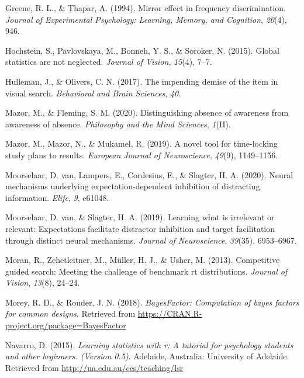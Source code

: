 \documentclass[
  english,
  man]{apa6}
\begin{document}
\leavevmode\hypertarget{ref-greene1994mirror}{}%
Greene, R. L., \& Thapar, A. (1994). Mirror effect in frequency discrimination. \emph{Journal of Experimental Psychology: Learning, Memory, and Cognition}, \emph{20}(4), 946.

\leavevmode\hypertarget{ref-hochstein2015global}{}%
Hochstein, S., Pavlovskaya, M., Bonneh, Y. S., \& Soroker, N. (2015). Global statistics are not neglected. \emph{Journal of Vision}, \emph{15}(4), 7--7.

\leavevmode\hypertarget{ref-hulleman2017impending}{}%
Hulleman, J., \& Olivers, C. N. (2017). The impending demise of the item in visual search. \emph{Behavioral and Brain Sciences}, \emph{40}.

\leavevmode\hypertarget{ref-mazor2020distinguishing}{}%
Mazor, M., \& Fleming, S. M. (2020). Distinguishing absence of awareness from awareness of absence. \emph{Philosophy and the Mind Sciences}, \emph{1}(II).

\leavevmode\hypertarget{ref-mazor2019novel}{}%
Mazor, M., Mazor, N., \& Mukamel, R. (2019). A novel tool for time-locking study plans to results. \emph{European Journal of Neuroscience}, \emph{49}(9), 1149--1156.

\leavevmode\hypertarget{ref-van2020neural}{}%
Moorselaar, D. van, Lampers, E., Cordesius, E., \& Slagter, H. A. (2020). Neural mechanisms underlying expectation-dependent inhibition of distracting information. \emph{Elife}, \emph{9}, e61048.

\leavevmode\hypertarget{ref-van2019learning}{}%
Moorselaar, D. van, \& Slagter, H. A. (2019). Learning what is irrelevant or relevant: Expectations facilitate distractor inhibition and target facilitation through distinct neural mechanisms. \emph{Journal of Neuroscience}, \emph{39}(35), 6953--6967.

\leavevmode\hypertarget{ref-moran2013competitive}{}%
Moran, R., Zehetleitner, M., Müller, H. J., \& Usher, M. (2013). Competitive guided search: Meeting the challenge of benchmark rt distributions. \emph{Journal of Vision}, \emph{13}(8), 24--24.

\leavevmode\hypertarget{ref-R-BayesFactor}{}%
Morey, R. D., \& Rouder, J. N. (2018). \emph{BayesFactor: Computation of bayes factors for common designs}. Retrieved from \url{https://CRAN.R-project.org/package=BayesFactor}

\leavevmode\hypertarget{ref-R-lsr}{}%
Navarro, D. (2015). \emph{Learning statistics with r: A tutorial for psychology students and other beginners. (Version 0.5)}. Adelaide, Australia: University of Adelaide. Retrieved from \url{http://ua.edu.au/ccs/teaching/lsr}
\end{document}
